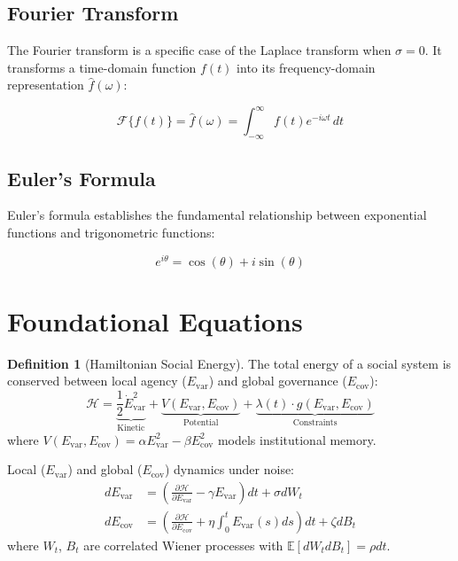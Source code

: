 \documentclass{article}
\theoremstyle{definition}
\newtheorem{definition}{Definition}[section]
\begin{document}
\subsection{Fourier Transform}

The Fourier transform is a specific case of the Laplace transform when $\sigma = 0$. It transforms a time-domain function $f(t)$ into its frequency-domain representation $\hat{f}(\omega)$:

\begin{equation}
    \mathcal{F}\{f(t)\} = \hat{f}(\omega) = \int_{-\infty}^{\infty} f(t) e^{-i\omega t} \, dt
\end{equation}

\subsection{Euler's Formula}

Euler's formula establishes the fundamental relationship between exponential functions and trigonometric functions:

\begin{equation}
    e^{i\theta} = \cos(\theta) + i\sin(\theta)
\end{equation}

\section{Foundational Equations}

\begin{definition}[Hamiltonian Social Energy]
\label{def:hamiltonian}
The total energy of a social system is conserved between local agency ($E_{\text{var}}$) and global governance ($E_{\text{cov}}$):
\begin{equation}
\mathcal{H} = \underbrace{\frac{1}{2} \dot{E}_{\text{var}}^2}_{\text{Kinetic}} + \underbrace{V(E_{\text{var}}, E_{\text{cov}})}_{\text{Potential}} + \underbrace{\lambda(t) \cdot g(E_{\text{var}}, E_{\text{cov}})}_{\text{Constraints}}
\label{eq:Hamiltonian}
\end{equation}
where $V(E_{\text{var}}, E_{\text{cov}}) = \alpha E_{\text{var}}^2 - \beta E_{\text{cov}}^2$ models institutional memory.
\end{definition}

\begin{proposition}
\label{prop:stochastic}
Local ($E_{\text{var}}$) and global ($E_{\text{cov}}$) dynamics under noise:
\begin{subequations}
\begin{align}
dE_{\text{var}} &= \left(\frac{\partial \mathcal{H}}{\partial E_{\text{var}}} - \gamma E_{\text{var}} \right)dt + \sigma dW_t \label{eq:local_sde} \\
dE_{\text{cov}} &= \left(\frac{\partial \mathcal{H}}{\partial E_{\text{cov}}} + \eta \int_0^t E_{\text{var}}(s) ds \right)dt + \zeta dB_t \label{eq:global_sde}
\end{align}
\end{subequations}
where $W_t$, $B_t$ are correlated Wiener processes with $\mathbb{E}[dW_t dB_t] = \rho dt$.
\end{proposition}
\end{document}
